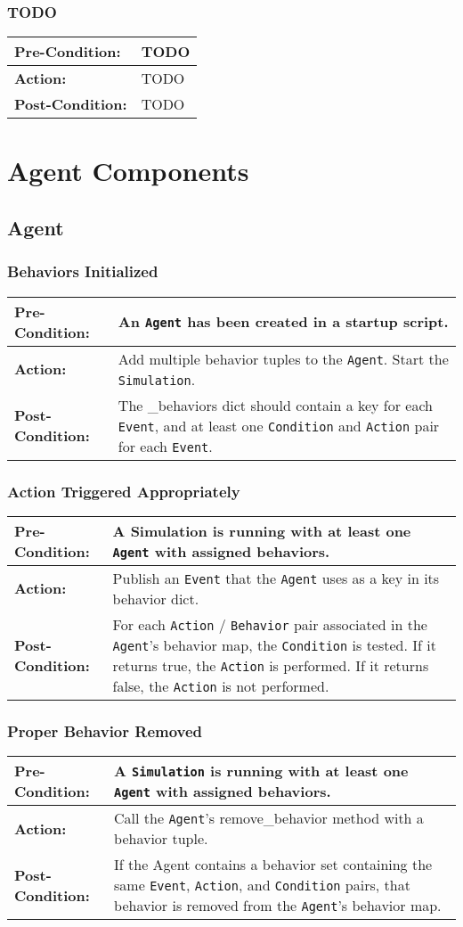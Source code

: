 \documentclass[titlepage]{article}
\newcommand{\testcase}[3]{
    \begin{center}
    \begin{tabular}{| l | p{0.7\textwidth}|}
        \hline
        \rowcolor[gray]{0.8}\textbf{Pre-Condition:} & #1 \\ \hline
        \textbf{Action:} & #2 \\ \hline
        \rowcolor[gray]{0.8}\textbf{Post-Condition:} & #3 \\ \hline
    \end{tabular}
    \end{center}
}
\begin{document}
\subsubsection{TODO}
\testcase{TODO}{TODO}{TODO}

\section{Agent Components}
\subsection{Agent}
\subsubsection{Behaviors Initialized}
\testcase{An \texttt{Agent} has been created in a startup script.}{Add multiple behavior tuples to the \texttt{Agent}.
Start the \texttt{Simulation}.}{The \_behaviors dict should contain a key for each \texttt{Event}, and at least one 
\texttt{Condition} and \texttt{Action} pair for each \texttt{Event}.}

\subsubsection{Action Triggered Appropriately}
\testcase{A Simulation is running with at least one \texttt{Agent} with assigned behaviors.}{Publish an \texttt{Event}
that the \texttt{Agent} uses as a key in its behavior dict.}{For each \texttt{Action} / \texttt{Behavior} pair
associated in the \texttt{Agent}'s behavior map, the \texttt{Condition} is tested.  If it returns true, the
\texttt{Action} is performed.  If it returns false, the \texttt{Action} is not performed.}

\subsubsection{Proper Behavior Removed}
\testcase{A \texttt{Simulation} is running with at least one \texttt{Agent} with assigned behaviors.}{Call the
\texttt{Agent}'s remove\_behavior method with a behavior tuple.}{If the Agent contains a behavior set containing the
same \texttt{Event}, \texttt{Action}, and \texttt{Condition} pairs, that behavior is removed from the \texttt{Agent}'s
behavior map.}

\end{document}
